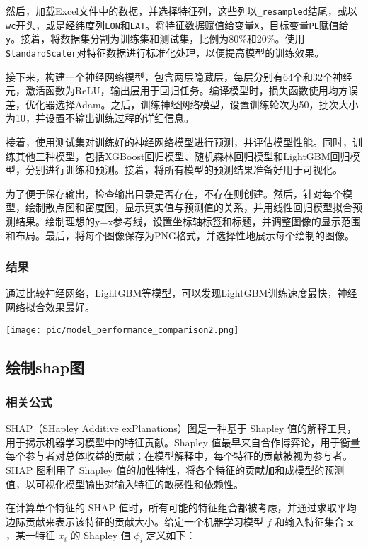 \documentclass{article}
\begin{document}
然后，加载Excel文件中的数据，并选择特征列，这些列以\texttt{\_resampled}结尾，或以\texttt{wc}开头，或是经纬度列\texttt{LON}和\texttt{LAT}。将特征数据赋值给变量\texttt{X}，目标变量\texttt{PL}赋值给\texttt{y}。接着，将数据集分割为训练集和测试集，比例为80\%和20\%。使用\texttt{StandardScaler}对特征数据进行标准化处理，以便提高模型的训练效果。

接下来，构建一个神经网络模型，包含两层隐藏层，每层分别有64个和32个神经元，激活函数为ReLU，输出层用于回归任务。编译模型时，损失函数使用均方误差，优化器选择Adam。之后，训练神经网络模型，设置训练轮次为50，批次大小为10，并设置不输出训练过程的详细信息。

接着，使用测试集对训练好的神经网络模型进行预测，并评估模型性能。同时，训练其他三种模型，包括XGBoost回归模型、随机森林回归模型和LightGBM回归模型，分别进行训练和预测。接着，将所有模型的预测结果准备好用于可视化。

为了便于保存输出，检查输出目录是否存在，不存在则创建。然后，针对每个模型，绘制散点图和密度图，显示真实值与预测值的关系，并用线性回归模型拟合预测结果。绘制理想的y=x参考线，设置坐标轴标签和标题，并调整图像的显示范围和布局。最后，将每个图像保存为PNG格式，并选择性地展示每个绘制的图像。
\subsubsection{结果}
通过比较神经网络，LightGBM等模型，可以发现LightGBM训练速度最快，神经网络拟合效果最好。
\par
\texttt{[image: pic/model\_performance\_comparison2.png]} %

\subsection{绘制shap图}
\subsubsection{相关公式}
SHAP（SHapley Additive exPlanations）图是一种基于 Shapley 值的解释工具，用于揭示机器学习模型中的特征贡献。Shapley 值最早来自合作博弈论，用于衡量每个参与者对总体收益的贡献；在模型解释中，每个特征的贡献被视为参与者。SHAP 图利用了 Shapley 值的加性特性，将各个特征的贡献加和成模型的预测值，以可视化模型输出对输入特征的敏感性和依赖性。

在计算单个特征的 SHAP 值时，所有可能的特征组合都被考虑，并通过求取平均边际贡献来表示该特征的贡献大小。给定一个机器学习模型 \( f \) 和输入特征集合 \( \mathbf{x} \)，某一特征 \( x_i \) 的 Shapley 值 \( \phi_i \) 定义如下：
\end{document}
